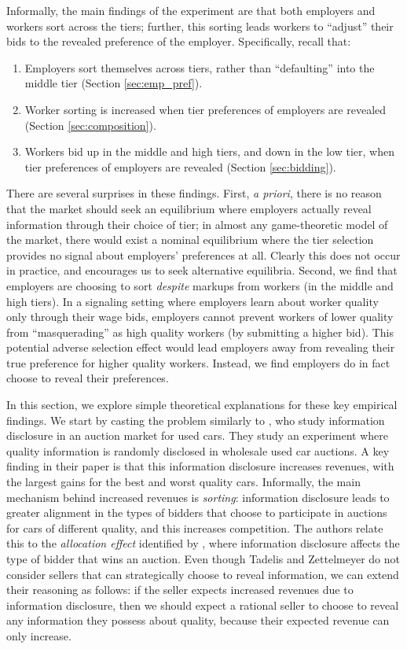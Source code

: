 Informally, the main findings of the experiment are that both employers and workers sort across the tiers;
further, this sorting leads workers to ``adjust'' their bids to the revealed preference of the employer. 
Specifically, recall that:
\begin{enumerate}
\item Employers sort themselves across tiers, rather than ``defaulting'' into the middle tier (Section \ref{sec:emp_pref}).
\item Worker sorting is increased when tier preferences of employers are revealed (Section \ref{sec:composition}).
\item Workers bid up in the middle and high tiers, and down in the low tier, when tier preferences of employers are revealed (Section \ref{sec:bidding}).
\end{enumerate}
There are several surprises in these findings.
First, {\em a priori}, there is no reason that the market should seek an equilibrium where employers actually reveal information through their choice of tier;
in almost any game-theoretic model of the market, there would exist a nominal equilibrium where the tier selection provides no signal about employers' preferences at all.
Clearly this does not occur in practice, and encourages us to seek alternative equilibria.
Second, we find that employers are choosing to sort {\em despite} markups from workers (in the middle and high tiers).
In a signaling setting where employers learn about worker quality only through their wage bids, employers cannot prevent workers of lower quality from ``masquerading'' as high quality workers (by submitting a higher bid).
This potential adverse selection effect would lead employers away from revealing their true preference for higher quality workers.
Instead, we find employers do in fact choose to reveal their preferences.

In this section, we explore simple theoretical explanations for these key empirical findings.
We start by casting the problem similarly to \cite{tadelis2011information}, who study information disclosure in an auction market for used cars.  
They study an experiment where quality information  is randomly disclosed in wholesale used car auctions.
A key finding in their paper is that this information disclosure increases revenues, with the largest gains for the best and worst quality cars.
Informally, the main mechanism behind increased revenues is {\em sorting}: information disclosure leads to greater alignment in the types of bidders that choose to participate in auctions for cars of different quality, and this increases competition.
The authors relate this to the {\em allocation effect} identified by \cite{board2009}, where information disclosure affects the type of bidder that wins an auction.  
Even though Tadelis and Zettelmeyer do not consider sellers that can strategically choose to reveal information, we can extend their reasoning as follows:
if the seller expects increased revenues due to information disclosure, then we should expect a rational seller to choose to reveal any information they possess about quality, because their expected revenue can only increase.

